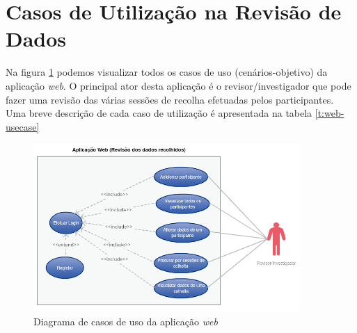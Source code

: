 \section{Casos de Utilização na Revisão de Dados}

Na figura \ref{f:usecasewebapp} podemos visualizar todos os casos de uso (cenários-objetivo) da aplicação \textit{web}. O principal ator desta aplicação é o revisor/investigador que pode fazer uma revisão das várias sessões de recolha efetuadas pelos participantes. Uma breve descrição de cada caso de utilização é apresentada na tabela \ref{t:web-usecase}
\newpage
\begin{figure}[H]
  \centering
  \includegraphics[width=0.9\textwidth]{imgs/app-web-usecase.png}
  \caption[Diagrama de casos de uso da aplicação \textit{web}]{Diagrama de casos de uso da aplicação \textit{web}}
  
  \label{f:usecasewebapp}
\end{figure}



